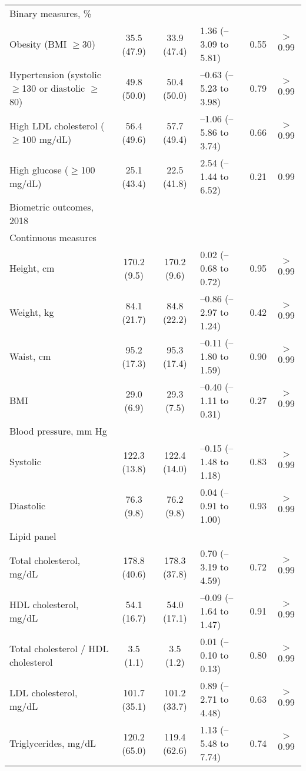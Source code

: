 \documentclass{article}
\begin{document}
\begin{table}[tbp]
{\begin{tabularx}{\linewidth}{lCClCC}
\hspace{1em} Binary measures, \%&&&&& \tabularnewline
\hspace{2em} Obesity (BMI $\geq$30)&35.5  (47.9)&33.9  (47.4)&1.36 (--3.09 to 5.81)&0.55&$>$0.99 \tabularnewline
\hspace{2em} Hypertension (systolic $\geq$130 or diastolic $\geq$80)&49.8  (50.0)&50.4  (50.0)&--0.63 (--5.23 to 3.98)&0.79&$>$0.99 \tabularnewline
\hspace{2em} High LDL cholesterol ($\geq$100 mg/dL)&56.4  (49.6)&57.7  (49.4)&--1.06 (--5.86 to 3.74)&0.66&$>$0.99 \tabularnewline
\hspace{2em} High glucose ($\geq$100 mg/dL)&25.1  (43.4)&22.5  (41.8)&2.54 (--1.44 to 6.52)&0.21&0.99 \tabularnewline
Biometric outcomes, 2018&&&&& \tabularnewline
\hspace{1em} Continuous measures&&&&& \tabularnewline
\hspace{2em} Height, cm&170.2  (9.5)&170.2  (9.6)&0.02 (--0.68 to 0.72)&0.95&$>$0.99 \tabularnewline
\hspace{2em} Weight, kg&84.1  (21.7)&84.8  (22.2)&--0.86 (--2.97 to 1.24)&0.42&$>$0.99 \tabularnewline
\hspace{2em} Waist, cm&95.2  (17.3)&95.3  (17.4)&--0.11 (--1.80 to 1.59)&0.90&$>$0.99 \tabularnewline
\hspace{2em} BMI&29.0  (6.9)&29.3  (7.5)&--0.40 (--1.11 to 0.31)&0.27&$>$0.99 \tabularnewline
Blood pressure, mm Hg&&&&& \tabularnewline
\hspace{3em} Systolic&122.3  (13.8)&122.4  (14.0)&--0.15 (--1.48 to 1.18)&0.83&$>$0.99 \tabularnewline
\hspace{3em} Diastolic&76.3  (9.8)&76.2  (9.8)&0.04 (--0.91 to 1.00)&0.93&$>$0.99 \tabularnewline
Lipid panel&&&&& \tabularnewline
\hspace{3em} Total cholesterol, mg/dL&178.8  (40.6)&178.3  (37.8)&0.70 (--3.19 to 4.59)&0.72&$>$0.99 \tabularnewline
\hspace{3em} HDL cholesterol, mg/dL&54.1  (16.7)&54.0  (17.1)&--0.09 (--1.64 to 1.47)&0.91&$>$0.99 \tabularnewline
\hspace{3em} Total cholesterol / HDL cholesterol&3.5  (1.1)&3.5  (1.2)&0.01 (--0.10 to 0.13)&0.80&$>$0.99 \tabularnewline
\hspace{3em} LDL cholesterol, mg/dL&101.7  (35.1)&101.2  (33.7)&0.89 (--2.71 to 4.48)&0.63&$>$0.99 \tabularnewline
\hspace{3em} Triglycerides, mg/dL&120.2  (65.0)&119.4  (62.6)&1.13 (--5.48 to 7.74)&0.74&$>$0.99 \tabularnewline

\end{tabularx}}
\end{table}
\end{document}
